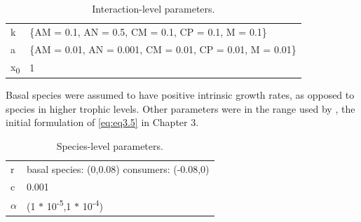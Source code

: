 \begin{longtable}[]{@{}ll@{}}
\caption[Model interaction parameters]{\color{Gray}Interaction-level parameters.}
\label{tab:tableApp3.1.3}\\
\toprule
\begin{minipage}[t]{0.08\columnwidth}\raggedright\strut
k\strut
\end{minipage} & \begin{minipage}[t]{0.56\columnwidth}\raggedright\strut
\{AM = 0.1, AN = 0.5, CM = 0.1, CP = 0.1, M = 0.1\}\strut
\end{minipage}\tabularnewline
\begin{minipage}[t]{0.08\columnwidth}\raggedright\strut
a\strut
\end{minipage} & \begin{minipage}[t]{0.56\columnwidth}\raggedright\strut
\{AM = 0.01, AN = 0.001, CM = 0.01, CP = 0.01, M = 0.01\}\strut
\end{minipage}\tabularnewline
\begin{minipage}[t]{0.08\columnwidth}\raggedright\strut
x\textsubscript{0}\strut
\end{minipage} & \begin{minipage}[t]{0.56\columnwidth}\raggedright\strut
1\strut
\end{minipage}\tabularnewline
\bottomrule
\end{longtable}

\newpage

Basal species were assumed to have positive intrinsic growth rates, as opposed to species in higher trophic levels. Other parameters were in the range used by \cite{Garcia-Algarra2014}, the initial formulation of \cref{eq:eq3.5} in Chapter 3.

\begin{longtable}[]{@{}ll@{}}
\caption[Model species parameters]{\color{Gray}Species-level parameters.}
\label{tab:tableApp3.1.4}\\
\toprule
\begin{minipage}[t]{0.13\columnwidth}\raggedright\strut
r\strut
\end{minipage} & \begin{minipage}[t]{0.30\columnwidth}\raggedright\strut
basal species: (0,0.08) consumers: (-0.08,0)\strut
\end{minipage}\tabularnewline
\begin{minipage}[t]{0.13\columnwidth}\raggedright\strut
c\strut
\end{minipage} & \begin{minipage}[t]{0.30\columnwidth}\raggedright\strut
0.001\strut
\end{minipage}\tabularnewline
\begin{minipage}[t]{0.13\columnwidth}\raggedright\strut
\(\alpha\)\strut
\end{minipage} & \begin{minipage}[t]{0.30\columnwidth}\raggedright\strut
(1 \(*\) 10\textsuperscript{-5},1 \(*\) 10\textsuperscript{-4})\strut
\end{minipage}\tabularnewline
\bottomrule
\end{longtable}

